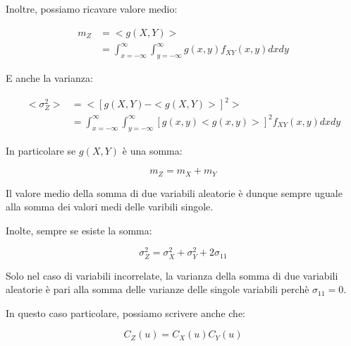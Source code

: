 Inoltre, possiamo ricavare valore medio: 

{
    \Large 
    \begin{equation}
        \begin{split}
            m_Z 
            &= 
            <g(X, Y)>
            \\ 
            &= 
            \int_{x = -\infty}^{\infty}
            \int_{y = -\infty}^{\infty}
            g(x, y) f_{XY} (x, y) 
            dx dy
        \end{split}
    \end{equation}
}

E anche la varianza: 

{
    \Large 
    \begin{equation}
        \begin{split}
            <\sigma_Z ^{2}> 
            &= 
            <[g(X, Y) - <g(X, Y) >]^{2}>
            \\ 
            &= 
            \int_{x = -\infty}^{\infty}
            \int_{y = -\infty}^{\infty}
            [g (x, y)  <g (x, y)>]^{2}
            f_{XY} (x, y)
            dx dy
        \end{split}
    \end{equation}
}

In particolare se $g(X, Y)$ è una somma: 

{
    \Large 
    \begin{equation}
        m_Z = m_X + m_Y
    \end{equation}
}

Il valore medio della somma di due variabili aleatorie è dunque sempre uguale alla somma dei valori medi delle varibili singole. \newline 

Inolte, sempre se esiste la somma: 

{
    \Large 
    \begin{equation}
        \sigma_Z ^{2} 
        = 
        \sigma_X ^{2} + \sigma_Y ^{2} + 2 \sigma_{11}  
    \end{equation}
}

Solo nel caso di variabili incorrelate, la varianza della somma di due variabili aleatorie è pari alla somma delle varianze delle singole variabili 
perchè $\sigma_{11} = 0$. \newline 

In questo caso particolare, possiamo scrivere anche che: 

{
    \Large 
    \begin{equation}
        C_Z (u) 
        = 
        C_X (u) C_Y (u)
    \end{equation}
} 

